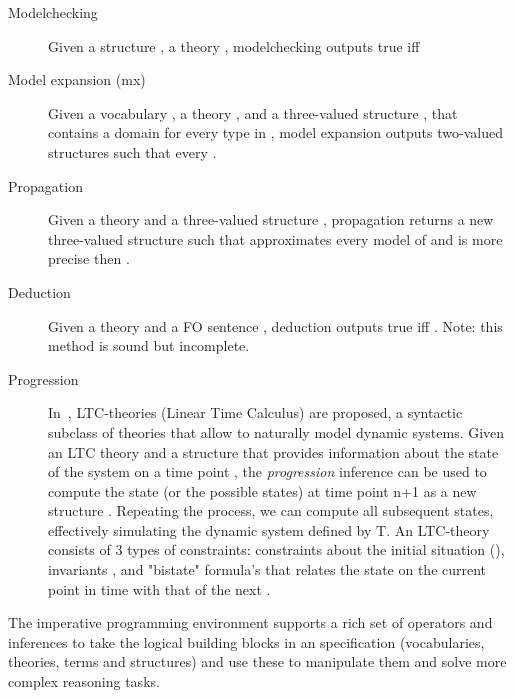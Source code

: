 \documentclass[runningheads]{llncs}
\newcommand{\logicname}[1]{\text{\sc #1}\xspace}
\newcommand{\fodotidp}{\logicname{FO(\ensuremath{\cdot})\ensuremath{^{\mathtt{IDP}}}}}
\newcommand{\fodot}{\logicname{FO(\ensuremath{\cdot})}}
\newcommand{\ignore}[1]{}
\begin{document}
\begin{description}
 \item[Modelchecking] Given a structure , a theory , modelchecking outputs true iff 
 \item[Model expansion (mx)] Given a vocabulary , a \fodot theory , and a three-valued structure , that contains a domain  for every type in , model expansion outputs two-valued structures  such that every .
 \item[Propagation] Given a \fodot theory  and a three-valued structure , propagation returns a new three-valued structure  such that  approximates every model of  and is more precise then .
 \item[Deduction] Given a \fodot theory  and a FO sentence , deduction outputs true iff . Note: this method is sound but incomplete.
 \item[Progression] 
 In~\cite{iclp/BogaertsTemp}, LTC-theories (Linear Time Calculus) are proposed, a syntactic subclass of \fodot theories that allow to naturally model dynamic systems. 
 Given an LTC theory and a structure  that provides information about the state of the system on a time point , the \emph{progression} inference can be used to compute the state (or the possible states) at time point n+1 as a new structure . 
 Repeating the process, we can compute all subsequent states, effectively simulating the dynamic system defined by T. 
 An LTC-theory consists of 3 types of constraints: constraints about the initial situation (), invariants , and "bistate" formula's that relates the state on the current point in time with that of the next .
\ignore{ A small example is included in listing \ref{progress}, which also contains structure  the result of the progression.
 \begin{lstlisting}[caption={A dynamic system: a lamp.},label={progress}]
vocabulary V {
    type Time
    LampOn(Time)
    PushSwitch(Time)
}
theory sp_theory1: sp_voc {
    //Constraints about the initial state
    ~LampOn(0).
    //BiState constraints
    !t:~LampOn(t)&PushSwitch(t)=>LampOn(t+1).
    !t:LampOn(t)&PushSwitch(t)=>~LampOn(t+1).
}
structure I_0 {
    Time=0..5
    LampOn={}
    PushSwitch={0}
}
structure I_1 {
    Time=0..5
    LampOn={1}
    PushSwitch={}
}
\end{lstlisting}}
 
 \end{description}
 The imperative programming environment supports a rich set of operators and inferences to take the logical building blocks in an \fodotidp specification (vocabularies, theories, terms and structures) and use these to manipulate them and solve more complex reasoning tasks.
 
\end{document}
